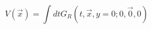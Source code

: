 \begin{equation}
\label{rev1}
V(\vec{x}) = \int dt G_R(t, \vec{x}, y=0; 0, \vec{0}, 0)
\end{equation}

